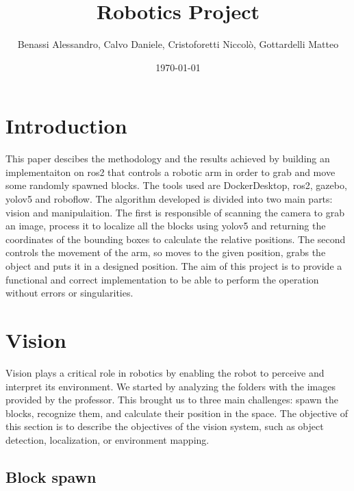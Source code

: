 \documentclass[12pt,a4paper]{article}
\title{Robotics Project}
\author{Benassi Alessandro, Calvo Daniele, Cristoforetti Niccolò, Gottardelli Matteo}
\date{\today}
\begin{document}
\maketitle
\tableofcontents
\newpage

\section{Introduction}\label{sec:intro}
This paper descibes the methodology and the results achieved by building an implementaiton on ros2 that controls a robotic arm in order to grab and move some randomly spawned blocks. The tools used are DockerDesktop, ros2, gazebo, yolov5 and roboflow. The algorithm developed is divided into two main parts: vision and manipulaition. The first is responsible of scanning the camera to grab an image, process it to localize all the blocks using yolov5 and returning the coordinates of the bounding boxes to calculate the relative positions. The second controls the movement of the arm, so moves to the given position, grabs the object and puts it in a designed position.
The aim of this project is to provide a functional and correct implementation to be able to perform the operation without errors or singularities.

\section{Vision}\label{sec:vision}
Vision plays a critical role in robotics by enabling the robot to perceive and interpret its environment. 
We started by analyzing the folders with the images provided by the professor. This brought us to three main challenges: spawn the blocks, recognize them, and calculate their position in the space. 
The objective of this section is to describe the objectives of the vision system, such as object detection, localization, or environment mapping.

\subsection{Block spawn}\label{subsec:blockspawn}
\end{document}
